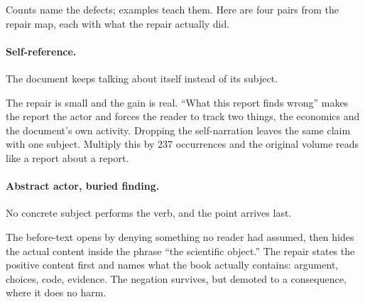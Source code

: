 Counts name the defects; examples teach them. Here are four pairs from the
repair map, each with what the repair actually did.

\paragraph{Self-reference.} The document keeps talking about itself instead
of its subject.

\begin{repairpair}
\end{repairpair}

\noindent
The repair is small and the gain is real. ``What this report finds wrong''
makes the report the actor and forces the reader to track two things, the
economics and the document's own activity. Dropping the self-narration leaves
the same claim with one subject. Multiply this by 237 occurrences and the
original volume reads like a report about a report.

\paragraph{Abstract actor, buried finding.} No concrete subject performs the
verb, and the point arrives last.

\begin{repairpair}
\end{repairpair}

\noindent
The before-text opens by denying something no reader had assumed, then hides
the actual content inside the phrase ``the scientific object.'' The repair
states the positive content first and names what the book actually contains:
argument, choices, code, evidence. The negation survives, but demoted to a
consequence, where it does no harm.

